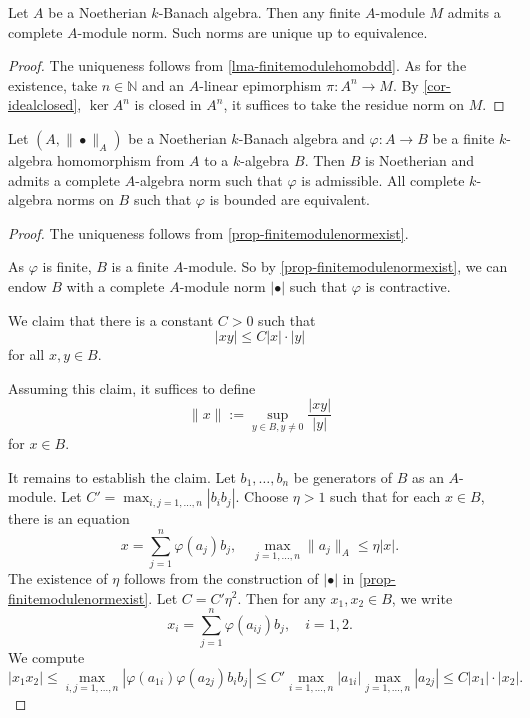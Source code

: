 \begin{proposition}\label{prop-finitemodulenormexist}
    Let $A$ be a Noetherian $k$-Banach algebra. Then any finite $A$-module $M$ admits a complete $A$-module norm. Such norms are unique up to equivalence.
\end{proposition}
\begin{proof}
    The uniqueness follows from \cref{lma-finitemodulehomobdd}. As for the existence, take $n\in \mathbb{N}$ and an $A$-linear epimorphism $\pi:A^n\rightarrow M$. By \cref{cor-idealclosed}, $\ker A^n$ is closed in $A^n$, it suffices to take the residue norm on $M$.
\end{proof}

\begin{proposition}\label{prop-algebrafinitenormadmi}
    Let $(A,\|\bullet\|_A)$ be a Noetherian $k$-Banach algebra and $\varphi:A\rightarrow B$ be a finite $k$-algebra homomorphism from $A$ to a $k$-algebra $B$. Then $B$ is Noetherian and admits a complete $A$-algebra norm such that $\varphi$ is admissible.
    All complete $k$-algebra norms on $B$ such that $\varphi$ is bounded are equivalent.
\end{proposition}
\begin{proof}
    The uniqueness follows from \cref{prop-finitemodulenormexist}.

    As $\varphi$ is finite, $B$ is a finite $A$-module. So by \cref{prop-finitemodulenormexist}, we can endow $B$ with a complete $A$-module norm $|\bullet|$ such that $\varphi$ is contractive. 

    We claim that there is a constant $C>0$ such that 
    \[
        |xy|\leq C |x|\cdot |y|  
    \]
    for all $x,y\in B$.
    
    Assuming this claim, it suffices to define
    \[
        \|x\|:=\sup_{y\in B,y\neq 0}\frac{|xy|}{|y|}
    \]
    for $x\in B$.

    It remains to establish the claim. Let $b_1,\ldots,b_n$ be generators of $B$ as an $A$-module. Let $C'=\max_{i,j=1,\ldots,n} |b_ib_j|$. Choose $\eta>1$ such that for each $x\in B$, there is an equation
    \[
        x=\sum_{j=1}^n \varphi(a_j)b_j,\quad \max_{j=1,\ldots,n} \|a_j\|_A \leq \eta |x|. 
    \]
    The existence of $\eta$ follows from the construction of $|\bullet|$ in \cref{prop-finitemodulenormexist}. Let $C=C'\eta^2$. Then for any $x_1,x_2\in B$, we write
    \[
        x_i=\sum_{j=1}^n \varphi(a_{ij})b_j,\quad i=1,2. 
    \]
    We compute
    \[
        |x_1x_2|\leq \max_{i,j=1,\ldots,n} |\varphi(a_{1i})\varphi(a_{2j})b_ib_j|\leq C'\max_{i=1,\ldots,n}|a_{1i}|\max_{j=1,\ldots,n}|a_{2j}|\leq C|x_1|\cdot|x_2|.  
    \]
\end{proof}



